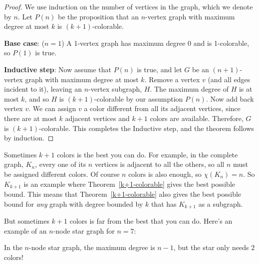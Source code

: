 \begin{proof}
We use induction on the number of vertices in the graph, which we
denote by $n$.  Let $P(n)$ be the proposition that an $n$-vertex graph
with maximum degree at most $k$ is $(k+1)$-colorable.

\textbf{Base case}: ($n=1$) A 1-vertex graph has maximum degree 0 and is
1-colorable, so $P(1)$ is true.

\textbf{Inductive step}: Now assume that $P(n)$ is true, and let $G$ be an
$(n+1)$-vertex graph with maximum degree at most $k$.  Remove a vertex $v$
(and all edges incident to it), leaving an $n$-vertex subgraph, $H$.  The
maximum degree of $H$ is at most $k$, and so $H$ is $(k+1)$-colorable by
our assumption $P(n)$.  Now add back vertex $v$.  We can assign $v$ a
color different from all its adjacent vertices, since there are at
most $k$ adjacent vertices and $k+1$ colors are available.  Therefore, $G$
is $(k+1)$-colorable.  This completes the Inductive step, and the theorem
follows by induction.
\end{proof}


Sometimes $k+1$ colors is the best you can do.  For example, in the
complete graph, $K_{n}$, every one of its $n$ vertices is adjacent to all
the others, so all $n$ must be assigned different colors.  Of course $n$
colors is also enough, so $\chi(K_n)=n$.  So $K_{k+1}$ is an example where
Theorem~\ref{k+1-colorable} gives the best possible bound.  This means
that Theorem~\ref{k+1-colorable} also gives the best possible bound for
\emph{any} graph with degree bounded by $k$ that has $K_{k+1}$ as a
subgraph.

\iffalse
obviously requires $k+1$ 
Consider a graph on $n$
nodes with all possible edges, so $d=n-1$.  This is called the {\em
complete graph} $K_n$ or a {\em clique}, just like a clique of friends,
where nodes represent the people and an edge represents the friendship
relationship.\footnote{ When speaking of friends, clique is usually
pronounced similar to click.  However, for some reason, graph theorists
think that the word clique rhymes with geek.}

\mfigure{!}{1.5in}{figures/complete-graph.pdf}
\fi

But sometimes $k+1$ colors is far from the best that you can do.  Here's
an example of an $n$-node star graph for $n=7$:


In the $n$-node star graph, the maximum degree is $n-1$, but the star only
needs $2$ colors!


